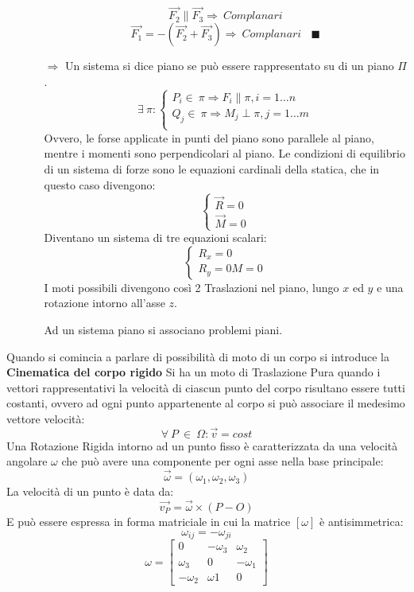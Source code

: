 \documentclass{article}
\begin{document}
\begin{adjustwidth}{2in}{}
\begin{enumerate}
\begin{itemize}
\[\]
\[
\vec{F_{2}} \parallel \vec{F_{3}} \Rightarrow ~ Complanari 
\]
\[
\vec{F_{1}} = -(\vec{F_{2}} + \vec{F_{3}}) \Rightarrow ~ Complanari ~~~~ \blacksquare
\]
\item[$\Rightarrow$] Un sistema si dice piano se può essere rappresentato su di un piano $\Pi$. 
\[ 
\exists~\pi : \begin{cases}
	P_{i} \in~\pi \Rightarrow F_{i} \parallel \pi, i = 1 \dots n \\
	Q_{j} \in~\pi \Rightarrow M_{j} \perp \pi, j = 1 \dots m \\
\end{cases}
\]
Ovvero, le forse applicate in punti del piano sono parallele al piano, mentre i momenti sono perpendicolari al piano. \newline
Le condizioni di equilibrio di un sistema di forze sono le equazioni cardinali della statica, che in questo caso divengono: 
\[ 
\begin{cases}
\vec{R} = 0 \\
\vec{M} = 0
\end{cases}
\]
Diventano un sistema di tre equazioni scalari: 
\[ 
\begin{cases}
	R_{x} = 0 \\
	R_{y} = 0
	M = 0
\end{cases}
\]
I moti possibili divengono  così 2 Traslazioni nel piano, lungo $x$ ed $y$ e una rotazione intorno all'asse $z$.

Ad un sistema piano si associano problemi piani. 

 


\end{itemize}
\end{enumerate}
\newpage
Quando si comincia a parlare di possibilità di moto di un corpo si introduce la
{\Large \textbf{Cinematica del corpo rigido}} \mbox{} \newline
Si ha un moto di Traslazione Pura quando i vettori rappresentativi la velocità di ciascun punto del corpo risultano essere tutti costanti, ovvero ad ogni punto appartenente al corpo si può associare il medesimo vettore velocità:
\[ \forall~P~\in~\Omega : \vec{v}=cost\]
Una Rotazione Rigida intorno ad un punto fisso è caratterizzata da una velocità angolare $\omega$ che può avere una componente per ogni asse nella base principale: 
\[ \vec{\omega} = (\omega_{1}, \omega_{2}, \omega_{3})\]
La velocità di un punto è data da: 
\[ \vec{v_{P}} = \vec{\omega} \times (P-O)
\]
E può essere espressa in forma matriciale in cui la matrice $[\omega]$ è antisimmetrica:
\[ 
\omega_{ij} = -\omega_{ji}
\]
\[
\omega = \left[\begin{array}{ccc}
	0 & -\omega_{3} & \omega_{2} \\
	\omega_{3} & 0 & -\omega_{1} \\
	-\omega_{2} & \omega{1} & 0
\end{array}\right]
\]


\end{adjustwidth}
\end{document}
